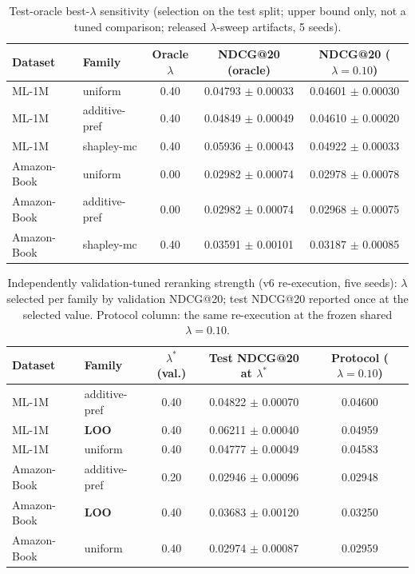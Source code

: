 \documentclass[pdflatex,sn-mathphys-num]{sn-jnl}
\begin{document}
\begin{table}[t]
\caption{Test-oracle best-$\lambda$ sensitivity (selection on the test split; upper bound only, not a tuned comparison; released $\lambda$-sweep artifacts, 5 seeds).}\label{tab:lambda_oracle}
\centering
\small
\begin{tabular}{llccc}
\toprule
Dataset & Family & Oracle $\lambda$ & NDCG@20 (oracle) & NDCG@20 ($\lambda{=}0.10$) \\
\midrule
ML-1M & uniform & 0.40 & 0.04793 $\pm$ 0.00033 & 0.04601 $\pm$ 0.00030 \\
ML-1M & additive-pref & 0.40 & 0.04849 $\pm$ 0.00049 & 0.04610 $\pm$ 0.00020 \\
ML-1M & shapley-mc & 0.40 & 0.05936 $\pm$ 0.00043 & 0.04922 $\pm$ 0.00033 \\
Amazon-Book & uniform & 0.00 & 0.02982 $\pm$ 0.00074 & 0.02978 $\pm$ 0.00078 \\
Amazon-Book & additive-pref & 0.00 & 0.02982 $\pm$ 0.00074 & 0.02968 $\pm$ 0.00075 \\
Amazon-Book & shapley-mc & 0.40 & 0.03591 $\pm$ 0.00101 & 0.03187 $\pm$ 0.00085 \\
\bottomrule
\end{tabular}
\end{table}

\begin{table}[t]
\caption{Independently validation-tuned reranking strength (v6 re-execution, five seeds): $\lambda$ selected per family by validation NDCG@20; test NDCG@20 reported once at the selected value. Protocol column: the same re-execution at the frozen shared $\lambda=0.10$.}\label{tab:lambda_tuned}
\centering
\small
\begin{tabular}{llccc}
\toprule
Dataset & Family & $\lambda^*$ (val.) & Test NDCG@20 at $\lambda^*$ & Protocol ($\lambda{=}0.10$) \\
\midrule
ML-1M & additive-pref & 0.40 & 0.04822 $\pm$ 0.00070 & 0.04600 \\
ML-1M & \textbf{LOO} & 0.40 & 0.06211 $\pm$ 0.00040 & 0.04959 \\
ML-1M & uniform & 0.40 & 0.04777 $\pm$ 0.00049 & 0.04583 \\
Amazon-Book & additive-pref & 0.20 & 0.02946 $\pm$ 0.00096 & 0.02948 \\
Amazon-Book & \textbf{LOO} & 0.40 & 0.03683 $\pm$ 0.00120 & 0.03250 \\
Amazon-Book & uniform & 0.40 & 0.02974 $\pm$ 0.00087 & 0.02959 \\
\bottomrule
\end{tabular}
\end{table}
\end{document}
